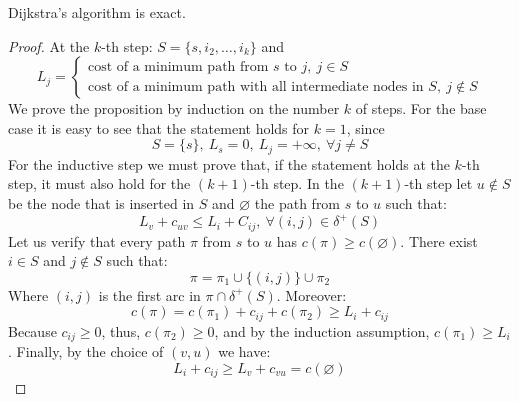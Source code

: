 \begin{proposition}
    Dijkstra's algorithm is exact. 
\end{proposition}
\begin{proof}
    At the $k$-th step: $S = \{s,i_2,\dots,i_k\}$ and 
    \[L_j=
    \begin{cases}
        \text{cost of a minimum path from } s \text{ to } j,\:j \in S \\ 
        \text{cost of a minimum path with all intermediate nodes in } S, \: j \notin S
    \end{cases}
    \]
    We prove the proposition by induction on the number $k$ of steps. 
    For the base case it is easy to see that the statement holds for $k = 1$, since 
    \[S=\{s\},\: L_s=0,\: L_j= +\infty,\: \forall j \neq S \]
    For the inductive step we must prove that, if the statement holds at the $k$-th step, it must also hold for the $(k + 1)$-th step. 
    In the $(k + 1)$-th step let $u \notin S$be the node that is inserted in $S$ and $\varnothing$ the path from $s$ to $u$ such that:
    \[L_v + c_{uv} \leq L_i + C_{ij},\: \forall(i,j) \in \delta^{+}(S)\]
    Let us verify that every path $\pi$ from $s$ to $u$ has $c(\pi) \geq c(\varnothing)$. There exist $i \in S$ and $j \notin S$ such that: 
    \[\pi= \pi_1 \cup \{(i,j)\} \cup \pi_2\]
    Where $(i, j)$ is the first arc in $\pi \cap \delta^{+}(S)$. Moreover: 
    \[c(\pi) = c(\pi_1) + c_{ij} + c(\pi_2) \geq L_i + c_{ij}\]
    Because $c_{ij} \geq 0$, thus, $c(\pi_2) \geq 0$, and by the induction assumption, $c(\pi_1) \geq L_i$. Finally, by the choice of $(v,u)$ we have: 
    \[L_i + c_{ij} \geq L_v + c_{vu} = c(\varnothing)\]
\end{proof}

